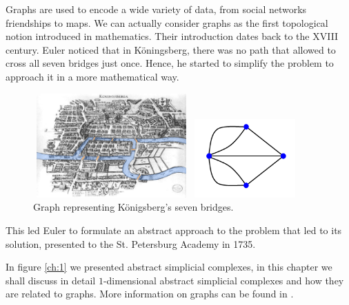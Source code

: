 \documentclass[../2.tex]{subfiles}
\begin{document}
    Graphs are used to encode a wide variety of data, from social networks friendships to maps.    
    We can actually consider graphs as the first topological notion introduced in mathematics.
    Their introduction dates back to the XVIII century.
    Euler noticed that in K{\"o}ningsberg, there was no path that 
    allowed to cross all seven bridges just once. Hence, he started to simplify the problem to approach it in a more mathematical 
    way.
    \begin{figure}[H]
        \begin{minipage}{.5\textwidth}
            \centering
            \includegraphics[width=6cm, height=4cm]{sections/2/Bridge}
            \caption{The city of K{\"o}nigsberg and the\\ seven bridges.}
            \label{fig:2:1}
        \end{minipage}
        \begin{minipage}{.5\textwidth}
            \centering
            \includegraphics[width=4cm, height=3cm]{sections/2/kgraph}
            \caption{Graph representing K{\"o}nigsberg's seven bridges.}
            \label{fig:2:2}
        \end{minipage}
    \end{figure}

    This led Euler to formulate an abstract approach to the problem that led to its solution, presented to the St. Petersburg
    Academy in 1735.

    In figure \ref{ch:1} we presented abstract simplicial complexes, in this chapter we shall discuss in detail
    $1$-dimensional abstract simplicial complexes and how they are related to graphs. More information
    on graphs can be found in \cite{bondy}.
\end{document}

